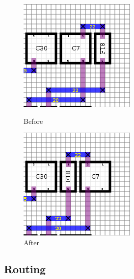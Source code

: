 \documentclass[10pt]{article}
\begin{document}
        \begin{figure}[H]
            \centering
            \begin{minipage}{.5\textwidth}
                \centering
                \includegraphics[width=0.7\linewidth]{./move_ft_before.png}
                \caption{Before}
            \end{minipage}%
            \begin{minipage}{.5\textwidth}
                \centering
                \includegraphics[width=0.7\linewidth]{./move_ft_after.png}
                \caption{After}
            \end{minipage}
        \end{figure}


\newpage
\subsection{Routing}
\end{document}
